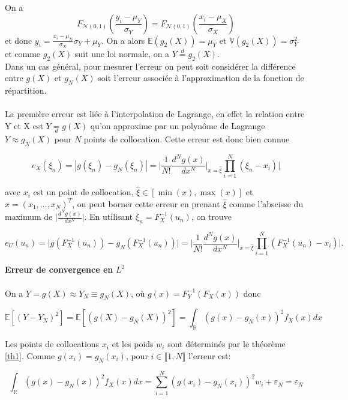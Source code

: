 \documentclass[a4paper,12pt]{report}
\numberwithin{equation}{section}
\theoremstyle{definition}
\numberwithin{equation}{section}
\begin{document}
On a $$F_{\mathcal{N}(0,1)}\left(\frac{y_{i}-\mu_{Y}}{\sigma_{Y}}\right)=F_{\mathcal{N}(0,1)}\left(\frac{x_{i}-\mu_{X}}{\sigma_{X}}\right)$$
et donc $y_{i}=\frac{x_{i}-\mu_{X}}{\sigma_{X}}\sigma_{Y}+\mu_{Y}$. On a alors $\mathbb{E}\left(g_{2}(X)\right)=\mu_{Y}$ et $\mathbb{V}\left(g_{2}(X)\right)=\sigma_{Y}^{2}$ et comme $g_{2}(X)$ suit une loi normale, on a $Y\overset{d}{=}g_{2}(X)$.
\\

Dans un cas général, pour mesurer l'erreur on peut soit considérer la différence entre $g(X)$ et $g_{N}(X)$ soit l'erreur associée à l'approximation de la fonction de répartition.
\\\\
La première erreur est liée à l'interpolation de Lagrange, en effet la relation entre Y et X est $Y\underset{d}{=}g(X)$ qu'on approxime par un polynôme de Lagrange $Y\approx g_{N}(X)$ pour $N$ points de collocation. Cette erreur est donc bien connue

$$e_{X}(\xi_{n})=|g(\xi_{n})-g_{N}(\xi_{n})|=\bigg|\frac{1}{N!}\frac{d^{N}g(x)}{dx^{N}}\bigg|_{x=\hat{\xi}}\prod_{i=1}^{N}(\xi_{n}-x_{i})\bigg|$$

avec $x_{i}$ est un point de collocation, $\hat{\xi}\in[\min(x),\max(x)]$ et $x=(x_{1},\dots,x_{N})^{T}$, on peut borner cette erreur en prenant $\hat{\xi}$ comme l'abscisse du maximum de $\bigg|\frac{d^{N}g(x)}{dx^{N}}\bigg|$. En utilisant $\xi_{n}=F_{X}^{-1}(u_{n})$, on trouve

$$e_{U}(u_{n})=\bigg|g\left(F_{X}^{-1}(u_{n})\right)-g_{N}\left(F_{X}^{-1}(u_{n})\right)\bigg|=\bigg|\frac{1}{N!}\frac{d^{N}g(x)}{dx^{N}}\bigg|_{x=\hat{\xi}}\prod_{i=1}^{N}\left(F_{X}^{-1}(u_{n})-x_{i}\right)\bigg|.$$

\textbf{Erreur de convergence en} $L^{2}$
\\\\
On a $Y=g(X)\approx Y_{N}\equiv g_{N}(X)$, où $g(x)=F_{Y}^{-1}(F_{X}(x))$ donc

$$\mathbb{E}\left[(Y-Y_{N})^{2}\right]=\mathbb{E}\left[(g(X)-g_{N}(X))^{2}\right]=\int_{\mathbb{R}}(g(x)-g_{N}(x))^{2}f_{X}(x)dx$$

Les points de collocations $x_{i}$ et les poids $w_{i}$ sont déterminés par le théorème \ref{th1}. Comme $g(x_{i})=g_{N}(x_{i})$, pour $i\in\llbracket1,N\rrbracket$ l'erreur est:

$$\int_{\mathbb{R}}(g(x)-g_{N}(x))^{2}f_{X}(x)dx=\sum_{i=1}^{N}(g(x_{i})-g_{N}(x_{i}))^{2}w_{i}+\varepsilon_{N}=\varepsilon_{N}$$
\end{document}
